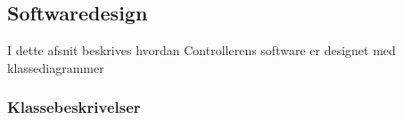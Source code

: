 \subsection*{Softwaredesign}

I dette afsnit beskrives hvordan Controllerens software er designet med klassediagrammer

\subsubsection*{Klassebeskrivelser}



